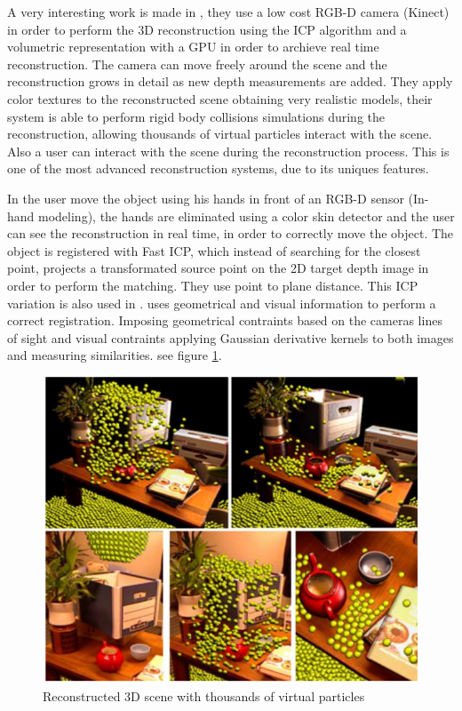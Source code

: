  
A very interesting work is made in \cite{izadi}, they use a low cost RGB-D camera (Kinect) in order to perform
the 3D reconstruction using the ICP algorithm  and a volumetric representation with a GPU in order to 
archieve real time reconstruction. The camera can move freely around the scene and the reconstruction grows in detail 
as new depth measurements are added. They apply color textures to the reconstructed scene obtaining very 
realistic models, their system is able to perform rigid body collisions 
simulations during the reconstruction, allowing thousands of virtual particles interact with the scene. Also a 
user can interact with the scene during the reconstruction process. This is one of the most advanced 
reconstruction systems, due to its uniques features.

In \cite{weise08} the user move the object using his hands in front of an RGB-D sensor (In-hand modeling), the hands are 
eliminated using a color skin detector and the user can see the reconstruction in real time, in order to correctly 
move the object.  The object is registered with Fast ICP, which instead of searching for the closest 
point, projects a transformated source point on the 2D target depth image in order to perform the matching. They use point
 to plane distance. This ICP variation is also used in \cite{jaeggli03}. \cite{weise08} uses geometrical and visual 
information to perform a correct registration. Imposing geometrical contraints based on the cameras lines of sight and visual 
contraints applying Gaussian derivative kernels to both images and measuring similarities.
 see figure \ref{fig:izadi}.


\begin{figure}[h!]
\begin{center}
\includegraphics[scale=0.34]{images/izadi}
\caption{Reconstructed 3D scene with thousands of virtual particles}
\label{fig:izadi}
\end{center}
\end{figure}


